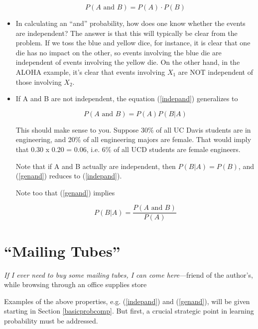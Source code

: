 \begin{itemize}
\begin{equation}
\label{indepand}
P(A \textrm{ and } B) = P(A) \cdot P(B)
\end{equation}

\item In calculating an ``and'' probability, how does one know whether
the events are independent?  The answer is that this will typically be
clear from the problem.  If we toss the blue and yellow dice, for
instance, it is clear that one die has no impact on the other, so events
involving the blue die are independent of events involving the yellow
die.  On the other hand, in the ALOHA example, it's clear that events
involving $X_1$ are NOT independent of those involving $X_2$.

\item If A and B are not independent, the equation (\ref{indepand})
generalizes to

\begin{equation}
\label{genand}
P(A \textrm{ and } B) = P(A) P(B|A)
\end{equation}

This should make sense to you.  Suppose 30\% of all UC Davis students
are in engineering, and 20\% of all engineering majors are female.  That
would imply that 0.30 x 0.20 = 0.06, i.e. 6\% of all UCD students are
female engineers.

Note that if A and B actually are independent, then $P(B|A) = P(B)$, and
(\ref{genand}) reduces to (\ref{indepand}).

Note too that (\ref{genand}) implies

\begin{equation}
\label{condba}
P(B|A) =
\frac
{ P(A \textrm{ and } B) }
{ P(A) }
\end{equation}

\end{itemize}

\section{``Mailing Tubes''}
\label{mailingtubes1}

{\it If I ever need to buy some mailing tubes, I can come here}---friend
of the author's, while browsing through an office supplies store

\bigskip

Examples of the above properties, e.g. (\ref{indepand}) and
(\ref{genand}), will be given starting in Section \ref{basicprobcomp}.
But first, a crucial strategic point in learning probability must be
addressed.

